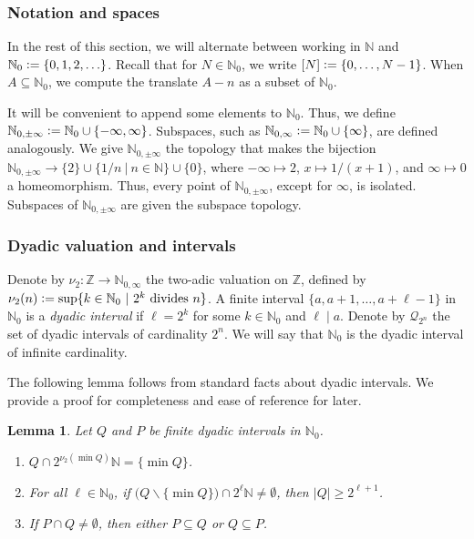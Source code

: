 \documentclass[letter,11pt]{article}
\theoremstyle{plain}
\newtheorem{lemma}[theorem]{Lemma}
\theoremstyle{definition}
\theoremstyle{plain}
\theoremstyle{plain}
\numberwithin{equation}{section}
\newcommand{\N}{\mathbb{N}}
\newcommand{\Z}{\mathbb{Z}}
\newcommand{\defeq}{\vcentcolon=}
\renewcommand{\geq}{\geqslant}
\renewcommand{\setminus}{\backslash}
\newcommand{\cubes}{\mathcal{Q}}
\begin{document}
\subsubsection{Notation and spaces}

In the rest of this section, we will alternate between working in $\N$ and $\N_0 \defeq \{0,1,2,\ldots\}$.  Recall that for $N \in \N_0$, we write $[N] \defeq \{0, \ldots, N-1\}$. When $A \subseteq \N_0$, we compute the translate $A-n$ as a subset of $\N_0$.

It will be convenient to append some elements to $\N_0$.  Thus, we define $\N_{0,\pm \infty} \defeq \N_0 \cup \{-\infty, \infty\}$.  Subspaces, such as $\N_{0,\infty} \defeq \N_0 \cup \{\infty\}$, are defined analogously.  We give $\N_{0,\pm \infty}$ the topology that makes the bijection $\N_{0,\pm \infty} \to \{2\} \cup \{1/n \ | \ n \in \N\} \cup \{0\}$, where $-\infty \mapsto 2$, $x \mapsto 1/(x+1)$, and $\infty \mapsto 0$ a homeomorphism.  Thus, every point of $\N_{0,\pm \infty}$, except for $\infty$, is isolated.  Subspaces of $\N_{0,\pm \infty}$ are given the subspace topology.

\subsubsection{Dyadic valuation and intervals}

Denote by $\nu_2: \Z \to \N_{0,\infty}$ the two-adic valuation on $\Z$, defined by $\nu_2(n) \defeq \sup \{k \in \N_0 \ | \ 2^k \text{ divides } n \}$. A finite interval $\{a, a+1, \ldots, a+\ell - 1\}$ in $\N_0$ is a \emph{dyadic interval} if $\ell = 2^k$ for some $k \in \N_0$ and $\ell \mid a$.  Denote by $\cubes_{2^n}$ the set of dyadic intervals of cardinality $2^n$.  We will say that $\N_0$ is the dyadic interval of infinite cardinality.


The following lemma follows from standard facts about dyadic intervals.  We provide a proof for completeness and ease of reference for later.

\begin{lemma}
\label{lemma_basic_dyadic_cubes_facts}
Let $Q$ and $P$ be finite dyadic intervals in $\N_0$.
\begin{enumerate}
    \item \label{item_dyadic_prop_two}
    $Q \cap 2^{\nu_2(\min Q)}\N = \{\min Q\}$.
    \item \label{item_dyadic_prop_three}
    For all $\ell \in \N_0$, if $\big(Q \setminus \{\min Q\} \big) \cap 2^{\ell} \N \neq \emptyset$, then $|Q| \geq 2^{\ell + 1}$.
    \item \label{item_dyadic_prop_one}
    If $P \cap Q \neq \emptyset$, then either $P \subseteq Q$ or $Q \subseteq P$.
\end{enumerate}
\end{lemma}
\end{document}
